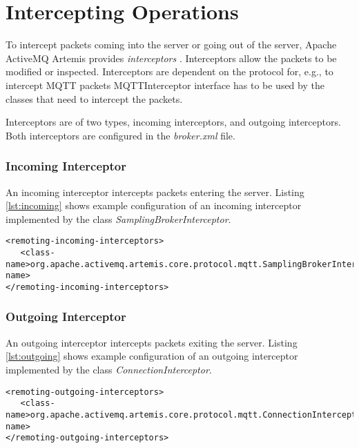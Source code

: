 \section{Intercepting Operations}

To intercept packets coming into the server or going out of the server, Apache ActiveMQ Artemis provides \textit{interceptors} \parencite{artemis_interceptors}. Interceptors allow the packets to be modified or inspected. Interceptors are dependent on the protocol for, e.g., to intercept MQTT packets MQTTInterceptor interface has to be used by the classes that need to intercept the packets. 

Interceptors are of two types, incoming interceptors, and outgoing interceptors. Both interceptors are configured in the \textit{broker.xml} file.

\subsubsection{Incoming Interceptor} \label{subsubsection:in_interceptor}

An incoming interceptor intercepts packets entering the server. Listing \ref{lst:incoming} shows example configuration of an incoming interceptor implemented by the class \textit{SamplingBrokerInterceptor}.

\bigskip
\begin{lstlisting}[style=XmlInputStyle,caption=Configuring incoming interceptor example, label={lst:incoming}]
<remoting-incoming-interceptors>
   <class-name>org.apache.activemq.artemis.core.protocol.mqtt.SamplingBrokerInterceptor</class-name>
</remoting-incoming-interceptors>
\end{lstlisting}

\subsubsection{Outgoing Interceptor}

An outgoing interceptor intercepts packets exiting the server. Listing \ref{lst:outgoing} shows example configuration of an outgoing interceptor implemented by the class \textit{ConnectionInterceptor}.

\bigskip
\begin{lstlisting}[style=XmlInputStyle,caption=Configuring outgoing interceptor example, label={lst:outgoing}]
<remoting-outgoing-interceptors>
   <class-name>org.apache.activemq.artemis.core.protocol.mqtt.ConnectionInterceptor</class-name>
</remoting-outgoing-interceptors>
\end{lstlisting}